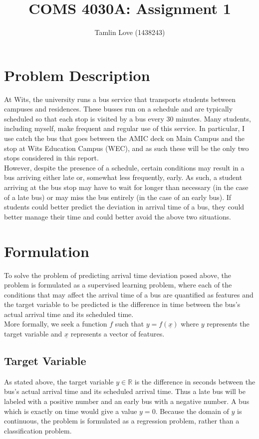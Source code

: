 \documentclass[11pt]{extarticle}
\title{\vspace{-2cm}COMS 4030A: Assignment 1}
\author{Tamlin Love (1438243)}
\date{}
\begin{document}
\maketitle

\section{Problem Description}
At Wits, the university runs a bus service that transports students between campuses and residences. These busses run on a schedule and are typically scheduled so that each stop is visited by a bus every 30 minutes. Many students, including myself, make frequent and regular use of this service. In particular, I use catch the bus that goes between the AMIC deck on Main Campus and the stop at Wits Education Campus (WEC), and as such these will be the only two stops considered in this report.
\\
However, despite the presence of a schedule, certain conditions may result in a bus arriving either late or, somewhat less frequently, early. As such, a student arriving at the bus stop may have to wait for longer than necessary (in the case of a late bus) or may miss the bus entirely (in the case of an early bus). If students could better predict the deviation in arrival time of a bus, they could better manage their time and could better avoid the above two situations.
\section{Formulation}
To solve the problem of predicting arrival time deviation posed above, the problem is formulated as a supervised learning problem, where each of the conditions that may affect the arrival time of a bus are quantified as features and the target variable to be predicted is the difference in time between the bus's actual arrival time and its scheduled time.
\\
More formally, we seek a function $f$ such that $y = f(\underline{x})$ where $y$ represents the target variable and $\underline{x}$ represents a vector of features.
\subsection{Target Variable}
As stated above, the target variable $y \in \mathbb{R}$ is the difference in seconds between the bus's actual arrival time and its scheduled arrival time. Thus a late bus will be labeled with a positive number and an early bus with a negative number. A bus which is exactly on time would give a value $y = 0$. Because the domain of $y$ is continuous, the problem is formulated as a regression problem, rather than a classification problem.
\end{document}
